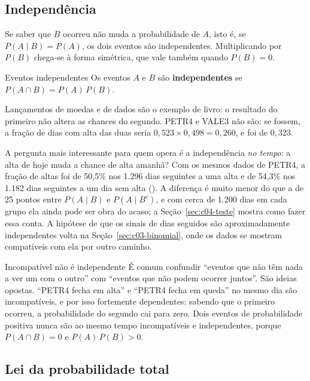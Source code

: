 \subsection{Independência}

Se saber que $B$ ocorreu não muda a probabilidade de $A$, isto é, se $P(A \mid B) = P(A)$, os dois eventos são independentes. Multiplicando por $P(B)$ chega-se à forma simétrica, que vale também quando $P(B) = 0$.

\begin{definicao}{Eventos independentes}
Os eventos $A$ e $B$ são \textbf{independentes} se $P(A \cap B) = P(A)\,P(B)$.
\end{definicao}

Lançamentos de moedas e de dados são o exemplo de livro: o resultado do primeiro não altera as chances do segundo. PETR4 e VALE3 não são: se fossem, a fração de dias com alta das duas seria $0,523 \times 0,498 = 0,260$, e foi de $0,323$.

A pergunta mais interessante para quem opera é a independência \emph{no tempo}: a alta de hoje muda a chance de alta amanhã? Com os mesmos dados de PETR4, a fração de altas foi de 50,5\% nos 1.296 dias seguintes a uma alta e de 54,3\% nos 1.182 dias seguintes a um dia sem alta (). A diferença é muito menor do que a de 25 pontos entre $P(A \mid B)$ e $P(A \mid B^c)$, e com cerca de 1.200 dias em cada grupo ela ainda pode ser obra do acaso; a Seção~\ref{sec:c04-teste} mostra como fazer essa conta. A hipótese de que os sinais de dias seguidos são aproximadamente independentes volta na Seção~\ref{sec:c03-binomial}, onde os dados se mostram compatíveis com ela por outro caminho.

\begin{armadilha}{Incompatível não é independente}
É comum confundir ``eventos que não têm nada a ver um com o outro'' com ``eventos que não podem ocorrer juntos''. São ideias opostas. ``PETR4 fecha em alta'' e ``PETR4 fecha em queda'' no mesmo dia são incompatíveis, e por isso fortemente dependentes: sabendo que o primeiro ocorreu, a probabilidade do segundo cai para zero. Dois eventos de probabilidade positiva nunca são ao mesmo tempo incompatíveis e independentes, porque $P(A \cap B) = 0$ e $P(A)\,P(B) > 0$.
\end{armadilha}

\subsection{Lei da probabilidade total}

